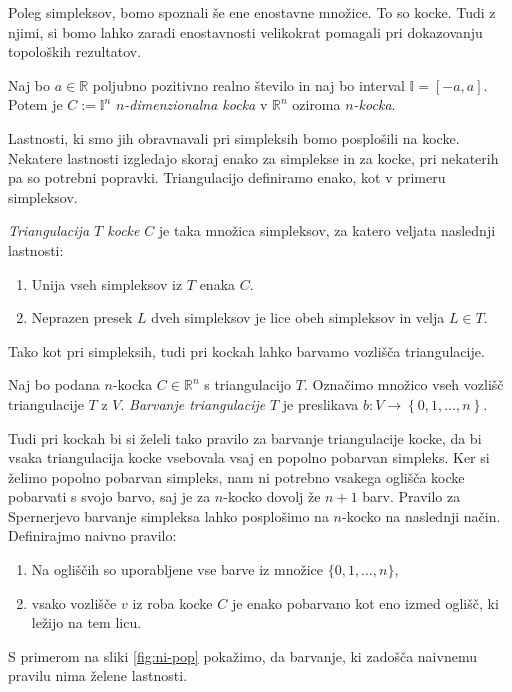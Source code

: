 \documentclass[mat1]{fmfdelo}
\newcommand{\R}{\mathbb R}
\newcommand{\I}{\mathbb I}
\newcommand{\0}{\underline{0}}
\begin{document}
Poleg simpleksov, bomo spoznali še ene enostavne množice. To so kocke. Tudi z njimi, si bomo lahko zaradi enostavnosti velikokrat pomagali pri dokazovanju topoloških rezultatov. 
\begin{definicija}
Naj bo $a \in \R$ poljubno pozitivno realno število in naj bo interval $\I = \left [ -a, a \right ] $. Potem je $C := \I^n$ \emph{$n$-dimenzionalna kocka} v $\R^n$ oziroma \emph{$n$-kocka}.
\end{definicija}
Lastnosti, ki smo jih obravnavali pri simpleksih bomo posplošili na kocke. Nekatere lastnosti izgledajo skoraj enako za simplekse in za kocke, pri nekaterih pa so potrebni popravki.
Triangulacijo definiramo enako, kot v primeru simpleksov.
\begin{definicija}
\emph{Triangulacija $T$ kocke} $C$ je taka množica simpleksov, za katero veljata naslednji lastnosti:
\begin{enumerate}
\item Unija vseh simpleksov iz $T$ enaka $C$.
\item Neprazen presek $L$ dveh simpleksov je lice obeh simpleksov in velja $L \in T$.
\end{enumerate}
\end{definicija}
Tako kot pri simpleksih, tudi pri kockah lahko barvamo vozlišča triangulacije.
\begin{definicija}
Naj bo podana $n$-kocka $C \in \R^n$ s triangulacijo $T$. Označimo množico vseh vozlišč triangulacije $T$ z $V$. \emph{Barvanje triangulacije} $T$ je preslikava $b : V \to \left \{0, 1, \dots, n \right \}$.
\end{definicija}
Tudi pri kockah bi si želeli tako pravilo za barvanje triangulacije kocke, da bi vsaka triangulacija kocke vsebovala vsaj en popolno pobarvan simpleks. Ker si želimo popolno pobarvan simpleks, nam ni potrebno vsakega oglišča kocke pobarvati s svojo barvo, saj je za $n$-kocko dovolj že $n+1$ barv.  Pravilo za Spernerjevo barvanje simpleksa lahko posplošimo na $n$-kocko na naslednji način.
Definirajmo naivno pravilo:
\begin{enumerate}
\item Na ogliščih so uporabljene vse barve iz množice $\{0, 1, \dots, n \}$,
\item vsako vozlišče $v$ iz roba kocke $C$ je enako pobarvano kot eno izmed oglišč, ki ležijo na tem licu.
\end{enumerate}
S primerom na sliki \ref{fig:ni-pop} pokažimo, da barvanje, ki zadošča naivnemu pravilu nima želene lastnosti.
\end{document}
